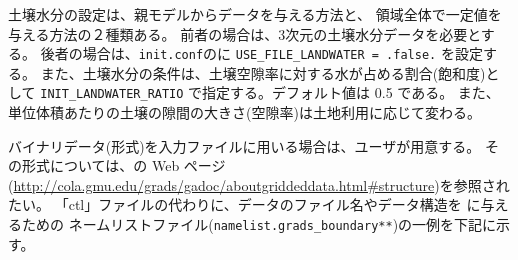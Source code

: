 土壌水分の設定は、親モデルからデータを与える方法と、
領域全体で一定値を与える方法の２種類ある。
前者の場合は、3次元の土壌水分データを必要とする。
後者の場合は、\verb|init.conf|のに
\verb|USE_FILE_LANDWATER = .false.| を設定する。
また、土壌水分の条件は、土壌空隙率に対する水が占める割合(飽和度)として
\verb|INIT_LANDWATER_RATIO| で指定する。デフォルト値は 0.5 である。
また、単位体積あたりの土壌の隙間の大きさ(空隙率)は土地利用に応じて変わる。\\

バイナリデータ({\grads}形式)を入力ファイルに用いる場合は、ユーザが用意する。
その形式については、\grads の Web ページ
(\url{http://cola.gmu.edu/grads/gadoc/aboutgriddeddata.html#structure})を参照されたい。
「ctl」ファイルの代わりに、データのファイル名やデータ構造を \scalerm に与えるための
ネームリストファイル(\verb|namelist.grads_boundary**|)の一例を下記に示す。\\


